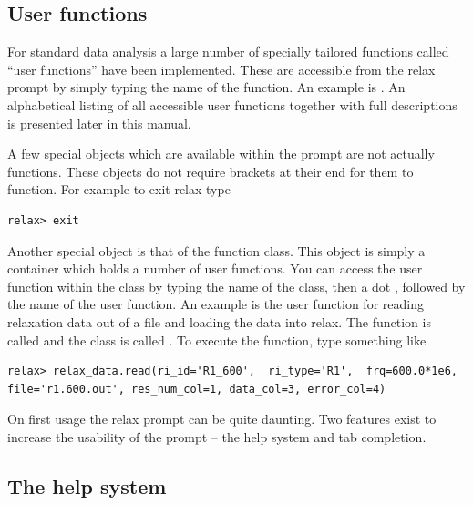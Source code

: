 
\subsection{User functions}

For standard data analysis a large number of specially tailored functions called ``user functions'' have been implemented.  These are accessible from the relax prompt by simply typing the name of the function.  An example is .  An alphabetical listing of all accessible user functions together with full descriptions is presented later in this manual.

A few special objects which are available within the prompt are not actually functions.  These objects do not require brackets at their end for them to function.  For example to exit relax type

\begin{lstlisting}[numbers=none]
relax> exit
\end{lstlisting}

Another special object is that of the function class.  This object is simply a container which holds a number of user functions.  You can access the user function within the class by typing the name of the class, then a dot , followed by the name of the user function.  An example is the user function for reading relaxation data out of a file and loading the data into relax.  The function is called  and the class is called .  To execute the function, type something like

\begin{lstlisting}[numbers=none]
relax> relax_data.read(ri_id='R1_600',  ri_type='R1',  frq=600.0*1e6, file='r1.600.out', res_num_col=1, data_col=3, error_col=4)
\end{lstlisting}

On first usage the relax prompt can be quite daunting.  Two features exist to increase the usability of the prompt -- the help system and tab completion.




\subsection{The help system}

